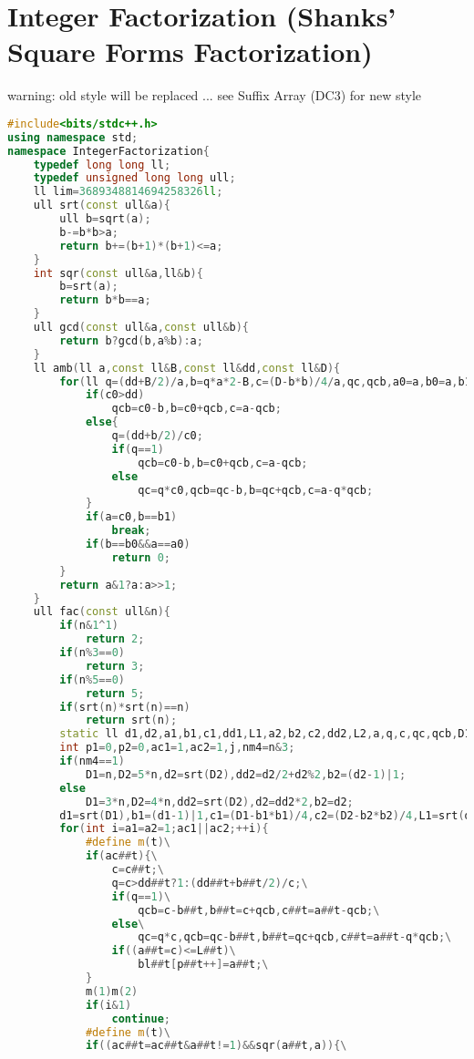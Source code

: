 \documentclass{book}
\begin{document}
\section{Integer Factorization (Shanks' Square Forms Factorization)}
warning: old style will be replaced ... see Suffix Array (DC3) for new style\begin{lstlisting}[language=C++,title={Integer Factorization (Shanks' Square Forms Factorization).hpp (4675 bytes, 147 lines)}]
#include<bits/stdc++.h>
using namespace std;
namespace IntegerFactorization{
    typedef long long ll;
    typedef unsigned long long ull;
    ll lim=3689348814694258326ll;
    ull srt(const ull&a){
        ull b=sqrt(a);
        b-=b*b>a;
        return b+=(b+1)*(b+1)<=a;
    }
    int sqr(const ull&a,ll&b){
        b=srt(a);
        return b*b==a;
    }
    ull gcd(const ull&a,const ull&b){
        return b?gcd(b,a%b):a;
    }
    ll amb(ll a,const ll&B,const ll&dd,const ll&D){
        for(ll q=(dd+B/2)/a,b=q*a*2-B,c=(D-b*b)/4/a,qc,qcb,a0=a,b0=a,b1=b,c0=c;;b1=b,c0=c){
            if(c0>dd)
                qcb=c0-b,b=c0+qcb,c=a-qcb;
            else{
                q=(dd+b/2)/c0;
                if(q==1)
                    qcb=c0-b,b=c0+qcb,c=a-qcb;
                else
                    qc=q*c0,qcb=qc-b,b=qc+qcb,c=a-q*qcb;
            }
            if(a=c0,b==b1)
                break;
            if(b==b0&&a==a0)
                return 0;
        }
        return a&1?a:a>>1;
    }
    ull fac(const ull&n){
        if(n&1^1)
            return 2;
        if(n%3==0)
            return 3;
        if(n%5==0)
            return 5;
        if(srt(n)*srt(n)==n)
            return srt(n);
        static ll d1,d2,a1,b1,c1,dd1,L1,a2,b2,c2,dd2,L2,a,q,c,qc,qcb,D1,D2,bl1[1<<19],bl2[1<<19];
        int p1=0,p2=0,ac1=1,ac2=1,j,nm4=n&3;
        if(nm4==1)
            D1=n,D2=5*n,d2=srt(D2),dd2=d2/2+d2%2,b2=(d2-1)|1;
        else
            D1=3*n,D2=4*n,dd2=srt(D2),d2=dd2*2,b2=d2;
        d1=srt(D1),b1=(d1-1)|1,c1=(D1-b1*b1)/4,c2=(D2-b2*b2)/4,L1=srt(d1),L2=srt(d2),dd1=d1/2+d1%2;
        for(int i=a1=a2=1;ac1||ac2;++i){
            #define m(t)\
            if(ac##t){\
                c=c##t;\
                q=c>dd##t?1:(dd##t+b##t/2)/c;\
                if(q==1)\
                    qcb=c-b##t,b##t=c+qcb,c##t=a##t-qcb;\
                else\
                    qc=q*c,qcb=qc-b##t,b##t=qc+qcb,c##t=a##t-q*qcb;\
                if((a##t=c)<=L##t)\
                    bl##t[p##t++]=a##t;\
            }
            m(1)m(2)
            if(i&1)
                continue;
            #define m(t)\
            if((ac##t=ac##t&a##t!=1)&&sqr(a##t,a)){\

\end{lstlisting}
\end{document}
